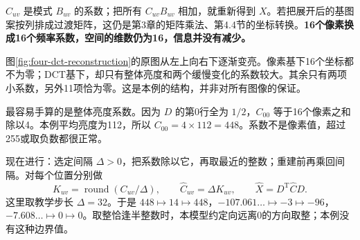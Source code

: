 \documentclass[a4paper,12pt,twoside,openany,fontset=none]{ctexbook}
\numberwithin{equation}{chapter}
\begin{document}
$C_{uv}$ 是模式 $B_{uv}$ 的系数；把所有 $C_{uv}B_{uv}$ 相加，就重新得到 $X$。若把展开后的基图案按列排成过渡矩阵，这仍是第3章的矩阵乘法、第4.4节的坐标转换。\textbf{16个像素换成16个频率系数，空间的维数仍为16，信息并没有减少。}

\clearpage
{}
图\ref{fig:four-dct-reconstruction}的原图从左上向右下逐渐变亮。像素基下16个坐标都不为零；DCT基下，却只有整体亮度和两个缓慢变化的系数较大。其余只有两项小系数，另外11项恰为零。这是本例的结构，并非对所有图像的保证。

最容易手算的是整体亮度系数。因为 $D$ 的第0行全为 $1/2$，$C_{00}$ 等于16个像素之和除以4。本例平均亮度为112，所以 $C_{00}=4\times112=448$。系数不是像素值，超过255或取负数都很正常。

现在进行：选定间隔 $\Delta>0$，把系数除以它，再取最近的整数；重建前再乘回间隔。对每个位置分别做
\[
 K_{uv}=\operatorname{round}(C_{uv}/\Delta),\qquad
 \widehat C_{uv}=\Delta K_{uv},\qquad
 \widehat X=D^{\mathrm T}\widehat C D.
\]
这里取教学步长 $\Delta=32$。于是 $448\mapsto14\mapsto448$，$-107.061\ldots\mapsto-3\mapsto-96$，$-7.608\ldots\mapsto0\mapsto0$。取整恰逢半整数时，本模型约定向远离0的方向取整；本例没有这种边界值。
\end{document}
